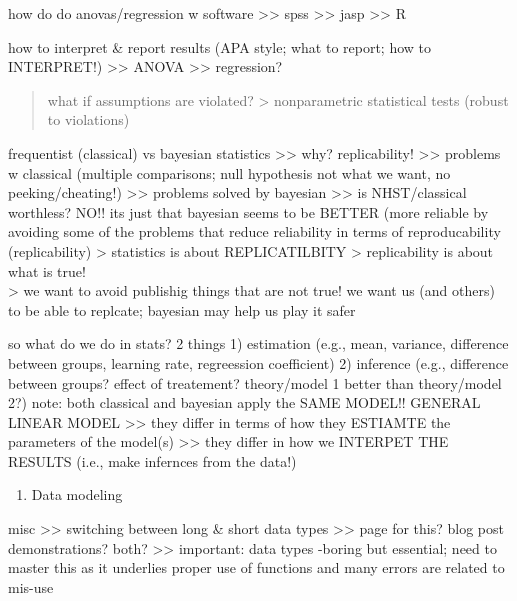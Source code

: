 \documentclass[
]{book}
\providecommand{\tightlist}{%
  \setlength{\itemsep}{0pt}\setlength{\parskip}{0pt}}
\begin{document}
how do do anovas/regression w software
\textgreater\textgreater{} spss
\textgreater\textgreater{} jasp
\textgreater\textgreater{} R

how to interpret \& report results (APA style; what to report; how to INTERPRET!)
\textgreater\textgreater{} ANOVA
\textgreater\textgreater{} regression?

\begin{quote}
what if assumptions are violated?
\textgreater{} nonparametric statistical tests (robust to violations)
\end{quote}

frequentist (classical) vs bayesian statistics
\textgreater\textgreater{} why? replicability!
\textgreater\textgreater{} problems w classical (multiple comparisons; null hypothesis not what we want, no peeking/cheating!)
\textgreater\textgreater{} problems solved by bayesian
\textgreater\textgreater{} is NHST/classical worthless? NO!! its just that bayesian seems to be BETTER (more reliable by avoiding some of the problems that reduce reliability in terms of reproducability (replicability)
\textgreater{} statistics is about REPLICATILBITY
\textgreater{} replicability is about what is true!\\
\textgreater{} we want to avoid publishig things that are not true! we want us (and others) to be able to replcate; bayesian may help us play it safer

so what do we do in stats? 2 things
1) estimation (e.g., mean, variance, difference between groups, learning rate, regreession coefficient)
2) inference (e.g., difference between groups? effect of treatement? theory/model 1 better than theory/model 2?)
note: both classical and bayesian apply the SAME MODEL!! GENERAL LINEAR MODEL
\textgreater\textgreater{} they differ in terms of how they ESTIAMTE the parameters of the model(s)
\textgreater\textgreater{} they differ in how we INTERPET THE RESULTS (i.e., make infernces from the data!)

\begin{enumerate}
\def\labelenumi{\arabic{enumi})}
\setcounter{enumi}{4}
\tightlist
\item
  Data modeling
\end{enumerate}

misc
\textgreater\textgreater{} switching between long \& short data types
\textgreater\textgreater{} page for this? blog post demonstrations? both?
\textgreater\textgreater{} important: data types -boring but essential; need to master this as it underlies proper use of functions and many errors are related to mis-use
\end{document}
